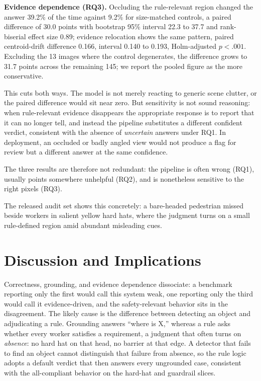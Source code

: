 \documentclass[12pt,letterpaper]{article}
\begin{document}
\textbf{Evidence dependence (RQ3).} Occluding the rule-relevant region changed the answer 39.2\% of the time against 9.2\% for size-matched controls, a paired difference of 30.0 points with bootstrap 95\% interval 22.3 to 37.7 and rank-biserial effect size 0.89; evidence relocation shows the same pattern, paired centroid-drift difference 0.166, interval 0.140 to 0.193, Holm-adjusted $p < .001$. Excluding the 13 images where the control degenerates, the difference grows to 31.7 points across the remaining 145; we report the pooled figure as the more conservative.

This cuts both ways. The model is not merely reacting to generic scene clutter, or the paired difference would sit near zero. But sensitivity is not sound reasoning: when rule-relevant evidence disappears the appropriate response is to report that it can no longer tell, and instead the pipeline substitutes a different confident verdict, consistent with the absence of \textit{uncertain} answers under RQ1. In deployment, an occluded or badly angled view would not produce a flag for review but a different answer at the same confidence.

The three results are therefore not redundant: the pipeline is often wrong (RQ1), usually points somewhere unhelpful (RQ2), and is nonetheless sensitive to the right pixels (RQ3).

The released audit set shows this concretely: a bare-headed pedestrian missed beside workers in salient yellow hard hats, where the judgment turns on a small rule-defined region amid abundant misleading cues.

\section{Discussion and Implications}

Correctness, grounding, and evidence dependence dissociate: a benchmark reporting only the first would call this system weak, one reporting only the third would call it evidence-driven, and the safety-relevant behavior sits in the disagreement. The likely cause is the difference between detecting an object and adjudicating a rule. Grounding answers ``where is X,'' whereas a rule asks whether every worker satisfies a requirement, a judgment that often turns on \textit{absence}: no hard hat on that head, no barrier at that edge. A detector that fails to find an object cannot distinguish that failure from absence, so the rule logic adopts a default verdict that then answers every ungrounded case, consistent with the all-compliant behavior on the hard-hat and guardrail slices.
\end{document}
